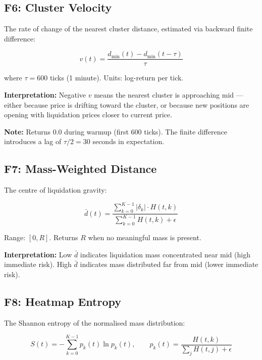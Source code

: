 \documentclass[11pt,a4paper]{article}
\begin{document}
\subsection{F6: Cluster Velocity}

The rate of change of the nearest cluster distance, estimated via backward finite difference:

\begin{equation}
v(t) = \frac{d_{\min}(t) - d_{\min}(t - \tau)}{\tau}
\end{equation}

where $\tau = 600$ ticks (1 minute). Units: log-return per tick.

\textbf{Interpretation:} Negative $v$ means the nearest cluster is approaching mid --- either because price is drifting toward the cluster, or because new positions are opening with liquidation prices closer to current price.

\textbf{Note:} Returns 0.0 during warmup (first 600 ticks). The finite difference introduces a lag of $\tau/2 = 30$ seconds in expectation.

\subsection{F7: Mass-Weighted Distance}

The centre of liquidation gravity:

\begin{equation}
\bar{d}(t) = \frac{\displaystyle\sum_{k=0}^{K-1} |\delta_k| \cdot H(t,k)}{\displaystyle\sum_{k=0}^{K-1} H(t,k) + \epsilon}
\end{equation}

Range: $[0, R]$. Returns $R$ when no meaningful mass is present.

\textbf{Interpretation:} Low $\bar{d}$ indicates liquidation mass concentrated near mid (high immediate risk). High $\bar{d}$ indicates mass distributed far from mid (lower immediate risk).

\subsection{F8: Heatmap Entropy}

The Shannon entropy of the normalised mass distribution:

\begin{equation}
S(t) = -\sum_{k=0}^{K-1} p_k(t) \ln p_k(t), \qquad p_k(t) = \frac{H(t,k)}{\displaystyle\sum_{j} H(t,j) + \epsilon}
\end{equation}
\end{document}
